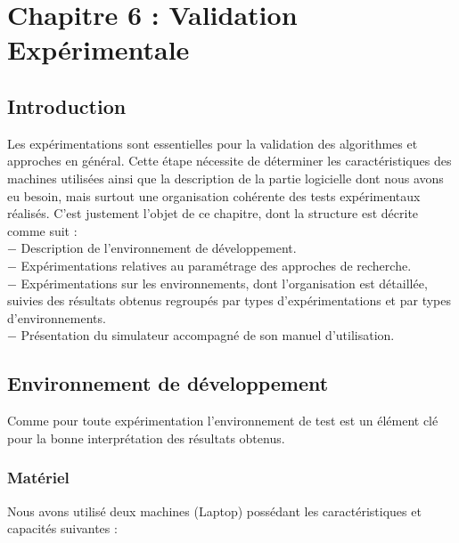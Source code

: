 
\chapter{Chapitre 6 : Validation Expérimentale } %

\label{Chapter6} %



\section{Introduction}
Les expérimentations sont essentielles pour la validation des algorithmes et approches en général. Cette étape nécessite de déterminer les caractéristiques des machines utilisées ainsi que la description de la partie logicielle dont nous avons eu besoin, mais surtout une organisation cohérente des tests expérimentaux réalisés. C'est justement l'objet de ce chapitre, dont la structure est décrite comme suit :\\
$-$ Description de l'environnement de développement.\\
$-$ Expérimentations relatives au paramétrage des approches de recherche.\\
$-$ Expérimentations sur les environnements, dont l'organisation est détaillée, suivies des résultats obtenus regroupés par types d'expérimentations et par types d'environnements.\\
$-$ Présentation du simulateur accompagné de son manuel d'utilisation.



\section{Environnement de développement}
\vspace{-0.2cm}
Comme pour toute expérimentation l'environnement de test est un élément clé pour la bonne interprétation des résultats obtenus.

\subsection{Matériel}
\vspace{-0.2cm}
Nous avons utilisé deux machines (Laptop) possédant les caractéristiques et capacités suivantes :


